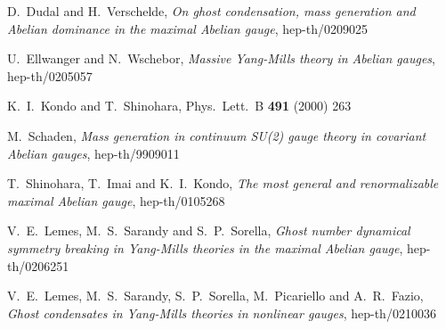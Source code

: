 \documentclass[a4paper,12pt]{article}
\begin{document}
\begin{thebibliography}{99}
  D.~Dudal and H.~Verschelde, \emph{On ghost condensation, mass generation
 and Abelian dominance in the  maximal Abelian gauge}, hep-th/0209025

U.~Ellwanger and N.~Wschebor, \emph{Massive Yang-Mills theory in
Abelian gauges}, hep-th/0205057

  K.~I.~Kondo and T.~Shinohara, Phys.\ Lett.\ B
\textbf{491} (2000) 263

  M.~Schaden, \emph{Mass generation in continuum SU(2) gauge theory in
covariant Abelian  gauges}, hep-th/9909011

  T.~Shinohara, T.~Imai and K.~I.~Kondo,
\emph{The most general and renormalizable maximal Abelian gauge},
hep-th/0105268

V.~E.~Lemes, M.~S.~Sarandy and S.~P.~Sorella, \emph{Ghost number
dynamical symmetry breaking in Yang-Mills theories in the maximal
Abelian gauge}, hep-th/0206251

V.~E.~Lemes, M.~S.~Sarandy, S.~P.~Sorella, M.~Picariello and
A.~R.~Fazio, \emph{Ghost condensates in Yang-Mills theories in
nonlinear gauges}, hep-th/0210036

\end{thebibliography}
\end{document}
